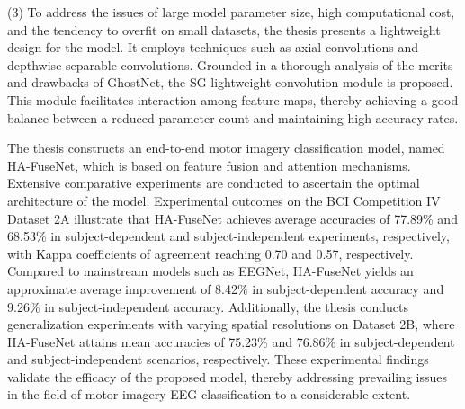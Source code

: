 (3) To address the issues of large model parameter size, high computational cost, and the tendency to overfit on small datasets, the thesis presents a lightweight design for the model. It employs techniques such as axial convolutions and depthwise separable convolutions. Grounded in a thorough analysis of the merits and drawbacks of GhostNet, the SG lightweight convolution module is proposed. This module facilitates interaction among feature maps, thereby achieving a good balance between a reduced parameter count and maintaining high accuracy rates.

The thesis constructs an end-to-end motor imagery classification model, named HA-FuseNet, which is based on feature fusion and attention mechanisms. Extensive comparative experiments are conducted to ascertain the optimal architecture of the model. Experimental outcomes on the BCI Competition IV Dataset 2A illustrate that HA-FuseNet achieves average accuracies of 77.89\% and 68.53\% in subject-dependent and subject-independent experiments, respectively, with Kappa coefficients of agreement reaching 0.70 and 0.57, respectively. Compared to mainstream models such as EEGNet, HA-FuseNet yields an approximate average improvement of 8.42\% in subject-dependent accuracy and 9.26\% in subject-independent accuracy. Additionally, the thesis conducts generalization experiments with varying spatial resolutions on Dataset 2B, where HA-FuseNet attains mean accuracies of 75.23\% and 76.86\% in subject-dependent and subject-independent scenarios, respectively. These experimental findings validate the efficacy of the proposed model, thereby addressing prevailing issues in the field of motor imagery EEG classification to a considerable extent.